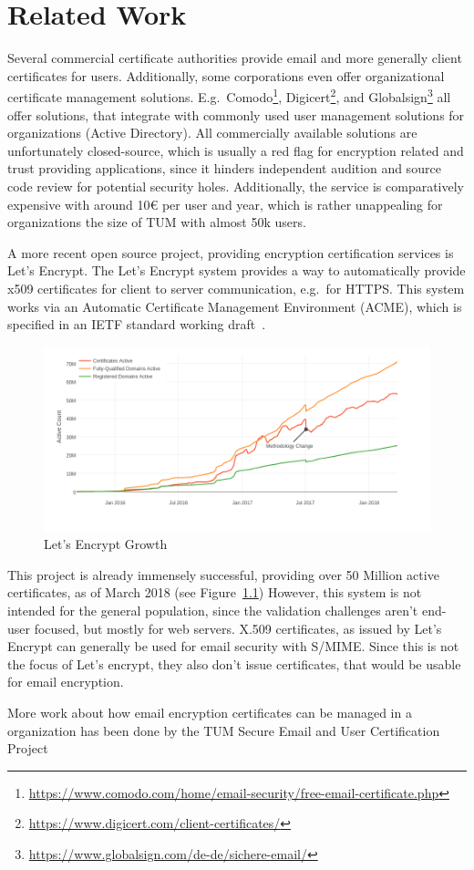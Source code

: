 \chapter{Related Work}\label{ch:relatedWork}
Several commercial certificate authorities provide email and more generally client certificates for users.
Additionally, some corporations even offer organizational certificate management solutions.
E.g.\ Comodo\footnote{\url{https://www.comodo.com/home/email-security/free-email-certificate.php}},
Digicert\footnote{\url{https://www.digicert.com/client-certificates/}}, and
Globalsign\footnote{\url{https://www.globalsign.com/de-de/sichere-email/}} all offer solutions, that integrate with
commonly used user management solutions for organizations (Active Directory).
All commercially available solutions are unfortunately closed-source, which is usually a red flag for encryption related
and trust providing applications, since it hinders independent audition and source code review for potential security
holes.
Additionally, the service is comparatively expensive with around 10€ per user and year, which is rather unappealing for
organizations the size of TUM with almost 50k users.

A more recent open source project, providing encryption certification services is Let's Encrypt.
The Let's Encrypt system provides a way to automatically provide x509 certificates for client to server communication,
e.g.\ for HTTPS\@.
This system works via an Automatic Certificate Management Environment (ACME), which is specified in an IETF standard
working draft~\cite{letsencrypteacme}.

\begin{figure}[hb]
    \centering
    \includegraphics[width=.675\textwidth]{figures/letsencryptusers.png}
    \caption{Let's Encrypt Growth~\cite{letsencryptstats}}
    \label{fig:letsencrypt}
\end{figure}

This project is already immensely successful, providing over 50 Million active certificates, as of March 2018 (see
Figure~\ref{fig:letsencrypt})
However, this system is not intended for the general population, since the validation challenges aren't end-user
focused, but mostly for web servers.
X.509 certificates, as issued by Let's Encrypt can generally be used for email security with S/MIME\@.
Since this is not the focus of Let's encrypt, they also don't issue certificates, that would be usable for email
encryption.

More work about how email encryption certificates can be managed in a organization has been done by the TUM Secure
Email and User Certification
Project~\cite{hauner2016interoperability, jagdish2016certservice, straub2016directoryservice, maier2015multidevice}

